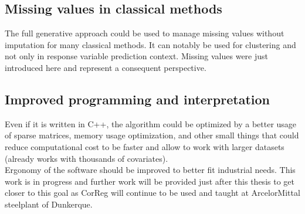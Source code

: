 \documentclass[12pt,a4paper]{report}
\begin{document}
			\subsection{Missing values in classical methods}
			The full generative approach could be used to manage missing values without imputation for many classical methods.
			It can notably be used for clustering and not only in response variable prediction context.
			Missing values were just introduced here and represent a consequent perspective.
		\subsection{Improved programming and interpretation}
			Even if it is written in C++, the algorithm could be optimized by a better usage of sparse matrices, memory usage optimization, and other small things that could reduce computational cost to be faster and allow to work with larger datasets (already works with thousands of covariates).\\
			Ergonomy of the software should be improved to better fit industrial needs. This work is in progress and further work will be provided just after this thesis to get closer to this goal as {\sc CorReg} will continue to be used and taught at ArcelorMittal steelplant of Dunkerque.
			
		
\cleardoublepage


%

%		
%		
%		
%		
%		
%			
\end{document}
